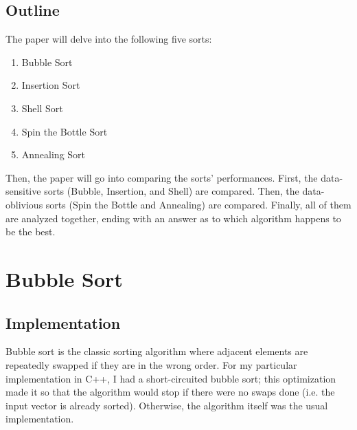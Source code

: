 \documentclass{article}
\begin{document}
\subsection{Outline}
    The paper will delve into the following five sorts:
    \begin{enumerate}
        \item{Bubble Sort}
        \item{Insertion Sort}
        \item{Shell Sort}
        \item{Spin the Bottle Sort}
        \item{Annealing Sort}
    \end{enumerate}
    \noindent Then, the paper will go into comparing the sorts' performances.
    First, the data-sensitive sorts (Bubble, Insertion, and Shell) are compared.
    Then, the data-oblivious sorts (Spin the Bottle and Annealing) are compared.
    Finally, all of them are analyzed together, ending with an answer as to
    which algorithm happens to be the best.

\section{Bubble Sort}
\subsection{Implementation}
    Bubble sort is the classic sorting algorithm where adjacent elements are
    repeatedly swapped if they are in the wrong order. For my particular
    implementation in C++, I had a short-circuited bubble sort; this
    optimization made it so that the algorithm would stop if there were no swaps
    done (i.e. the input vector is already sorted). Otherwise, the algorithm
    itself was the usual implementation.
\end{document}

